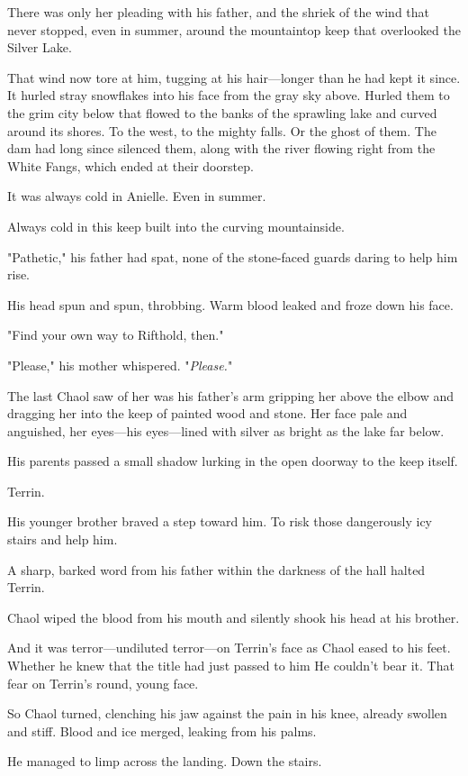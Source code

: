 There was only her pleading with his father, and the shriek of the wind that never stopped, even in summer, around the mountaintop keep that overlooked the Silver Lake.

That wind now tore at him, tugging at his hair---longer than he had kept it since.
It hurled stray snowflakes into his face from the gray sky above.
Hurled them to the grim city below that flowed to the banks of the sprawling lake and curved around its shores.
To the west, to the mighty falls.
Or the ghost of them.
The dam had long since silenced them, along with the river flowing right from the White Fangs, which ended at their doorstep.

It was always cold in Anielle.
Even in summer.

Always cold in this keep built into the curving mountainside.

"Pathetic," his father had spat, none of the stone-faced guards daring to help him rise.

His head spun and spun, throbbing.
Warm blood leaked and froze down his face.

"Find your own way to Rifthold, then."

"Please," his mother whispered.
"\emph{Please.}"

The last Chaol saw of her was his father's arm gripping her above the elbow and dragging her into the keep of painted wood and stone.
Her face pale and anguished, her eyes---his eyes---lined with silver as bright as the lake far below.

His parents passed a small shadow lurking in the open doorway to the keep itself.

Terrin.

His younger brother braved a step toward him.
To risk those dangerously icy stairs and help him.

A sharp, barked word from his father within the darkness of the hall halted Terrin.

Chaol wiped the blood from his mouth and silently shook his head at his brother.

And it was terror---undiluted terror---on Terrin's face as Chaol eased to his feet.
Whether he knew that the title had just passed to him 
He couldn't bear it.
That fear on Terrin's round, young face.

So Chaol turned, clenching his jaw against the pain in his knee, already swollen and stiff.
Blood and ice merged, leaking from his palms.

He managed to limp across the landing.
Down the stairs.


